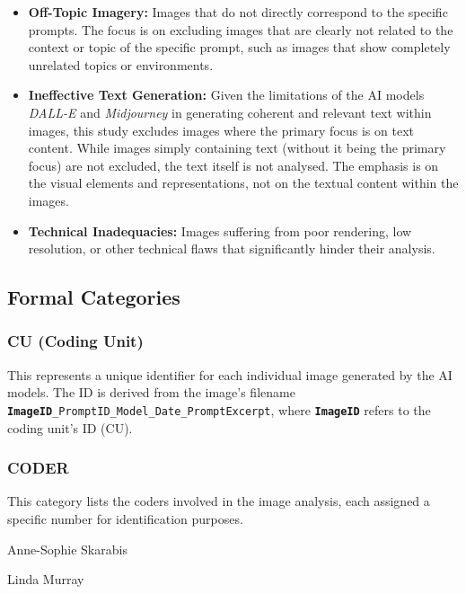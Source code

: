 \begin{itemize}
    \item \textbf{Off-Topic Imagery:} Images that do not directly correspond to the specific prompts. The focus is on excluding images that are clearly not related to the context or topic of the specific prompt, such as images that show completely unrelated topics or environments.
    \item \textbf{Ineffective Text Generation:} Given the limitations of the AI models \textit{DALL-E} and \textit{Midjourney} in generating coherent and relevant text within images, this study excludes images where the primary focus is on text content. While images simply containing text (without it being the primary focus) are not excluded, the text itself is not analysed. The emphasis is on the visual elements and representations, not on the textual content within the images.
    \item \textbf{Technical Inadequacies:} Images suffering from poor rendering, low resolution, or other technical flaws that significantly hinder their analysis.
\end{itemize}


\subsection{Formal Categories}
 \subsubsection*{CU (Coding Unit)} 

 This represents a unique identifier for each individual image generated by the AI models. The ID is derived from the image's filename \texttt{\textbf{ImageID}\_PromptID\_Model\_Date\_PromptExcerpt}, where \texttt{\textbf{ImageID}} refers to the coding unit's  ID (CU).
 
 \subsubsection*{CODER} 

 This category lists the coders involved in the image analysis, each assigned a specific number for identification purposes.
\begin{description}[leftmargin=2.5cm, style=multiline, labelwidth=1.5cm]
\item[1] Anne-Sophie Skarabis
\item[2] Linda Murray
\end{description}

